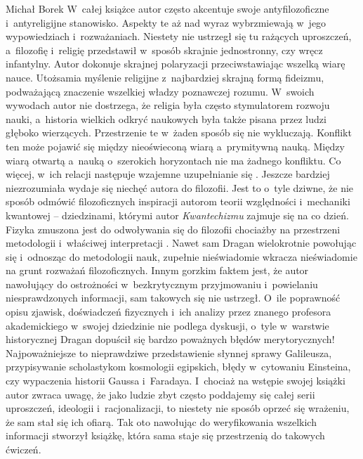 \begin{newrevplenv}{Michał Borek}
W~całej książce autor często akcentuje swoje antyfilozoficzne i~antyreligijne stanowisko. Aspekty te aż nad wyraz wybrzmiewają w~jego wypowiedziach i~rozważaniach. Niestety nie ustrzegł się tu rażących uproszczeń, a~filozofię i~religię przedstawił w~sposób skrajnie jednostronny, czy wręcz infantylny. Autor dokonuje skrajnej polaryzacji przeciwstawiając wszelką wiarę nauce. Utożsamia myślenie religijne z~najbardziej skrajną formą fideizmu, podważającą znaczenie wszelkiej władzy poznawczej rozumu. W~swoich wywodach autor nie dostrzega, że religia była często stymulatorem rozwoju nauki, a~historia wielkich odkryć naukowych była także pisana przez ludzi głęboko wierzących. Przestrzenie te w~żaden sposób się nie wykluczają. Konflikt ten może pojawić się między nieoświeconą wiarą a~prymitywną nauką. Między wiarą otwartą a~nauką o~szerokich horyzontach nie ma żadnego konfliktu. Co więcej, w~ich relacji następuje wzajemne uzupełnianie się
\parencites[np.][]{heller_czlowiek_2016}[][]{heller_nauka_2019}[zob. także][]{rodzen_teologia_2021}. %
 Jeszcze bardziej niezrozumiała wydaje się niechęć autora do filozofii. Jest to o~tyle dziwne, że nie sposób odmówić filozoficznych inspiracji autorom teorii względności i~mechaniki kwantowej – dziedzinami, którymi autor \textit{Kwantechizmu} zajmuje się na co dzień. Fizyka zmuszona jest do odwoływania się do filozofii chociażby na przestrzeni metodologii i~właściwej interpretacji 
\parencites[więcej zob. np.][]{heller_how_2019}[zob. także][]{polak_philosophy_2019}. %
 Nawet sam Dragan wielokrotnie powołując się i~odnosząc do metodologii nauk, zupełnie nieświadomie wkracza nieświadomie na grunt rozważań filozoficznych. Innym gorzkim faktem jest, że autor nawołujący do ostrożności w~bezkrytycznym przyjmowaniu i~powielaniu niesprawdzonych informacji, sam takowych się nie ustrzegł. O~ile poprawność opisu zjawisk, doświadczeń fizycznych i~ich analizy przez znanego profesora akademickiego w~swojej dziedzinie nie podlega dyskusji, o~tyle w~warstwie historycznej Dragan dopuścił się bardzo poważnych błędów merytorycznych! Najpoważniejsze to nieprawdziwe przedstawienie słynnej sprawy Galileusza, przypisywanie scholastykom kosmologii egipskich, błędy w~cytowaniu Einsteina, czy wypaczenia historii Gaussa i~Faradaya. I~chociaż na wstępie swojej książki autor zwraca uwagę, że jako ludzie zbyt często poddajemy się całej serii uproszczeń, ideologii i~racjonalizacji, to niestety nie sposób oprzeć się wrażeniu, że sam stał się ich ofiarą. Tak oto nawołując do weryfikowania wszelkich informacji stworzył książkę, która sama staje się przestrzenią do takowych ćwiczeń.


\end{newrevplenv}
